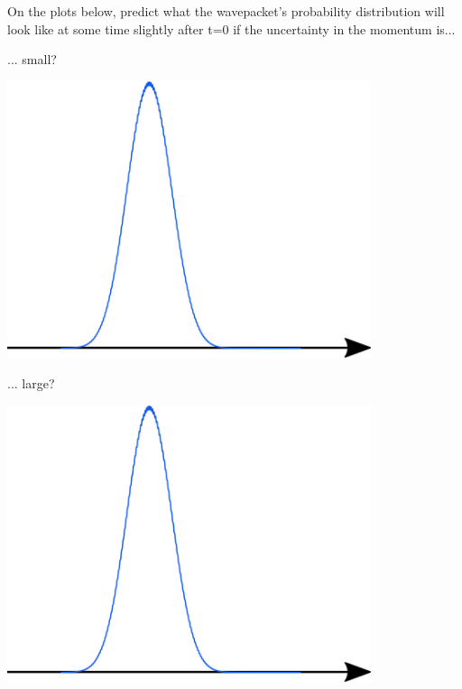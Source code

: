 \begin{questions}
	\vspace{0.1in}
		\question On the plots below, predict what the wavepacket's probability distribution will look like at some time slightly after t=0 if the uncertainty in the momentum is...

	\vspace{0.2in}
	\begin{minipage}{0.5\textwidth}
		\centerline{... small?}\vspace{0.1in}
		
	\centerline{\includegraphics[width=0.8\textwidth]{includes/wavepackets-FIGURES/gaussian.jpg}}
	\end{minipage}
	\begin{minipage}{0.5\textwidth}
		\centerline{... large?}\vspace{0.1in}
		
	\centerline{\includegraphics[width=0.8\textwidth]{includes/wavepackets-FIGURES/gaussian.jpg}}
	\end{minipage}
	

\end{questions}
